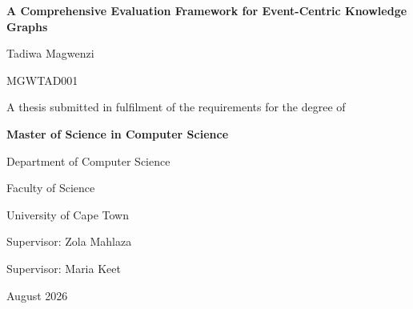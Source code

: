 \documentclass[12pt,a4paper]{report}
\begin{document}
\hypersetup{pageanchor=false}

\begin{titlepage}
    \centering
    \vspace*{2cm}
    
    {\LARGE\bfseries A Comprehensive Evaluation Framework for Event-Centric Knowledge Graphs\par}
    
    \vspace{2cm}
    
    {\Large Tadiwa Magwenzi\par}
    {\large MGWTAD001\par}
    
    \vspace{2cm}
    
    {\large A thesis submitted in fulfilment of the requirements for the degree of\par}
    {\large\bfseries Master of Science in Computer Science\par}
    
    \vspace{1.5cm}
    
    {\large Department of Computer Science\par}
    {\large Faculty of Science\par}
    {\large University of Cape Town\par}
    
    \vspace{1.5cm}
    
    {\large Supervisor: Zola Mahlaza\par}
    {\large Supervisor: Maria Keet\par}
    
    \vfill
    
    {\large August 2026\par}
\end{titlepage}

\hypersetup{pageanchor=true}


\clearpage


\clearpage


\clearpage

\tableofcontents
\clearpage

\listoffigures
\clearpage

\listoftables
\clearpage
\end{document}

